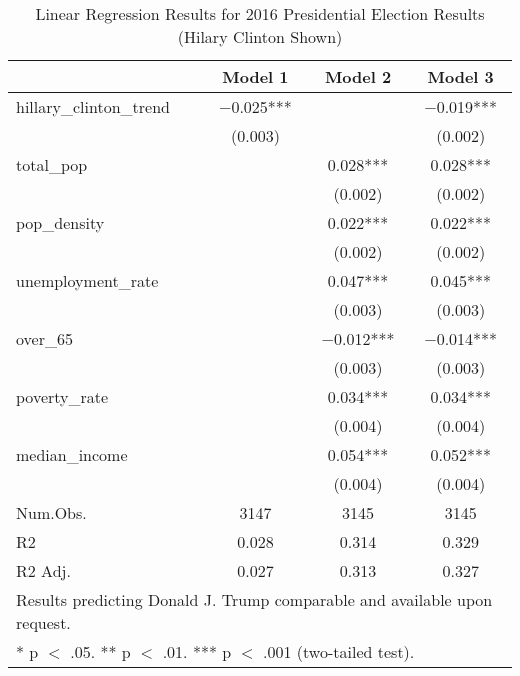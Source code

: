 \begin{table}[!h]

\caption{\label{tab:pres_2016_analysis}Linear Regression Results for 2016 Presidential Election Results (Hilary Clinton Shown)}
\centering
\fontsize{8}{10}\selectfont

\begin{tabular}{lccc}
\toprule
  & Model 1 & Model 2 & Model 3\\
\midrule

hillary\_clinton\_trend & \num{-0.025}*** &  & \num{-0.019}***\\
 & (\num{0.003}) &  & (\num{0.002})\\
total\_pop &  & \num{0.028}*** & \num{0.028}***\\
 &  & (\num{0.002}) & \vphantom{1} (\num{0.002})\\
pop\_density &  & \num{0.022}*** & \num{0.022}***\\
 &  & (\num{0.002}) & (\num{0.002})\\
unemployment\_rate &  & \num{0.047}*** & \num{0.045}***\\
 &  & (\num{0.003}) & \vphantom{1} (\num{0.003})\\
over\_65 &  & \num{-0.012}*** & \num{-0.014}***\\
 &  & (\num{0.003}) & (\num{0.003})\\
poverty\_rate &  & \num{0.034}*** & \num{0.034}***\\
 &  & (\num{0.004}) & \vphantom{1} (\num{0.004})\\
median\_income &  & \num{0.054}*** & \num{0.052}***\\
 &  & (\num{0.004}) & (\num{0.004})\\
\midrule
Num.Obs. & \num{3147} & \num{3145} & \num{3145}\\
R2 & \num{0.028} & \num{0.314} & \num{0.329}\\
R2 Adj. & \num{0.027} & \num{0.313} & \num{0.327}\\
\bottomrule
\multicolumn{4}{l}{\rule{0pt}{1em}Results predicting Donald J. Trump comparable and available upon request.}\\
\multicolumn{4}{l}{\rule{0pt}{1em}* p $<$ .05. ** p $<$ .01. *** p $<$ .001 (two-tailed test).}\\
\end{tabular}
\end{table}